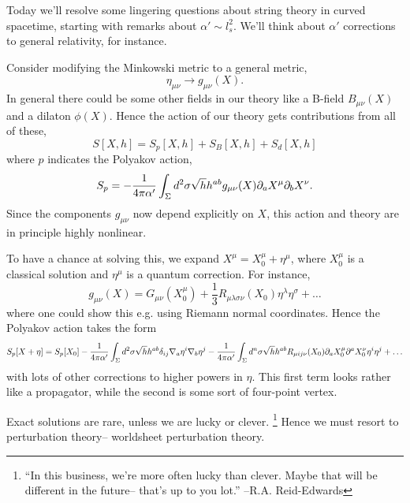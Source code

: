 Today we'll resolve some lingering questions about string theory in curved spacetime, starting with remarks about $\alpha' \sim l_s^2$. We'll think about $\alpha'$ corrections to general relativity, for instance.

Consider modifying the Minkowski metric to a general metric,
\begin{equation}
    \eta_{\mu\nu}\to g_{\mu\nu}(X).
\end{equation}
In general there could be some other fields in our theory like a B-field $B_{\mu\nu}(X)$ and a dilaton $\phi(X)$. Hence the action of our theory gets contributions from all of these,
\begin{equation}
    S[X,h]=S_p[X,h]+S_B[X,h]+S_d[X,h]
\end{equation}
where $p$ indicates the Polyakov action,
\begin{equation}
    S_p=-\frac{1}{4\pi \alpha'} \int_\Sigma d^2\sigma \sqrt{h} h^{ab} g_{\mu\nu}(X) \partial_a X^\mu \partial_b X^\nu.
\end{equation}
Since the components $g_{\mu\nu}$ now depend explicitly on $X$, this action and theory are in principle highly nonlinear.

To have a chance at solving this, we expand $X^\mu=X_0^\mu+ \eta^\mu$, where $X_0^\mu$ is a classical solution and $\eta^\mu$ is a quantum correction. For instance,
\begin{equation}
    g_{\mu\nu}(X)=G_{\mu\nu}(X_0^\mu)+\frac{1}{3} R_{\mu\lambda\sigma\nu}(X_0) \eta^\lambda \eta^\sigma + \ldots
\end{equation}
where one could show this e.g. using Riemann normal coordinates. Hence the Polyakov action takes the form
\begin{equation}
    S_p[X+\eta] = S_p[X_0] -\frac{1}{4\pi \alpha'} \int_\Sigma d^2\sigma \sqrt{h} h^{ab} \delta_{ij} \nabla_a \eta^i \nabla_b \eta^j -\frac{1}{4\pi\alpha'} \int_\Sigma d^n \sigma \sqrt{h} h^{ab} R_{\mu i j \nu}(X_0) \partial_a X^\mu_0 \partial^a X^\nu_0 \eta^i \eta^j + \ldots
\end{equation}
with lots of other corrections to higher powers in $\eta$. This first term looks rather like a propagator, while the second is some sort of four-point vertex.

Exact solutions are rare, unless we are lucky or clever.%
    \footnote{``In this business, we're more often lucky than clever. Maybe that will be different in the future-- that's up to you lot.'' --R.A. Reid-Edwards}
Hence we must resort to perturbation theory-- worldsheet perturbation theory.

